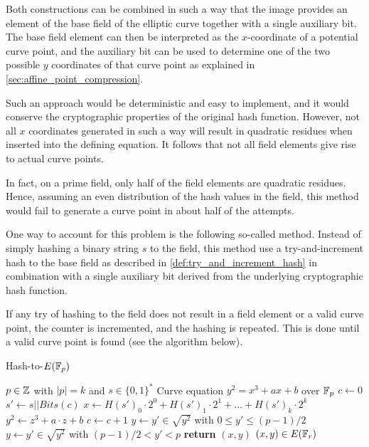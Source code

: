 Both constructions can be combined in such a way that the image provides an element of the base field of the elliptic curve together with a single auxiliary bit. The base field element can then be interpreted as the $x$-coordinate of a potential curve point, and the auxiliary bit can be used to determine one of the two possible $y$ coordinates of that curve point as explained in \ref{sec:affine_point_compression}.

Such an approach would be deterministic and easy to implement, and it would conserve the cryptographic properties of the original hash function. However, not all $x$ coordinates generated in such a way will result in quadratic residues when inserted into the defining equation. It follows that not all field elements give rise to actual curve points. 

In fact,
on a prime field, only half of the field elements are quadratic residues. Hence, assuming an even distribution of the hash values in the field, this method would fail to generate a curve point in about half of the attempts. 

One way to account for this problem is the following so-called  method. Instead of simply hashing a binary string $s$ to the field, this method use a try-and-increment hash to the base field as described in \ref{def:try_and_increment_hash} in combination with a single auxiliary bit derived from the underlying cryptographic hash function.

If any try of hashing to the field does not result in a field element or a valid curve point, the counter is incremented, and the hashing is repeated. This is done until a valid curve point is found (see the algorithm below).

\begin{algorithm}\label{alg:hash-to-e}\caption{Hash-to-$E(\mathbb{F}_p)$}
\begin{algorithmic}[0]
\Require $p \in \mathbb{Z}$ with $|p|=k$ and $s\in\{0,1\}^*$
\Require Curve equation $y^2 = x^3 + ax +b$ over $\mathbb{F}_p$
\State $c \gets 0$	
\Repeat
\State $s' \gets s||Bits(c)$
\State $x \gets H(s')_0\cdot 2^0 + H(s')_1\cdot 2^1 + \ldots + H(s')_{k}\cdot 2^{k}$ 
\State $y^2 \gets z^3 + a\cdot z + b$ 
\State $c\gets c+1$
 
 
\State $y \gets y'\in \sqrt{y^2}$ with $0\leq y' \leq (p-1)/2$
\Else 
\State $y \gets y'\in \sqrt{y^2}$ with $(p-1)/2 < y' < p$
\EndIf
\State \textbf{return} $(x,y)$
\EndProcedure
\Ensure $(x,y)\in E(\mathbb{F}_r)$
\end{algorithmic}
\end{algorithm}

